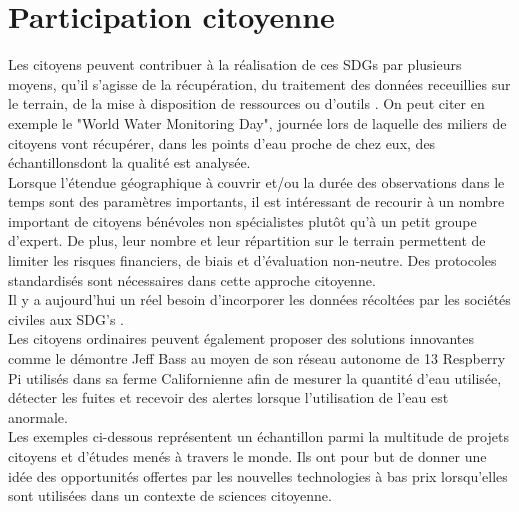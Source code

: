 \documentclass[10pt, article]{llncs}
\begin{document}
\section{Participation citoyenne}
	Les citoyens peuvent contribuer à la réalisation de ces SDGs par plusieurs moyens, qu'il s'agisse de la récupération, du traitement des données receuillies sur le terrain, de la mise à disposition de ressources ou d'outils \cite{lordkipanidze_che_nodate}. On peut citer en exemple le "World Water Monitoring Day", journée lors de laquelle des miliers de citoyens vont récupérer, dans les points d'eau proche de chez eux, des échantillonsdont la qualité est analysée. \\
	Lorsque l'étendue géographique à couvrir et/ou la durée des observations dans le temps sont des paramètres importants, il est intéressant de recourir à un nombre important de citoyens bénévoles non spécialistes plutôt qu'à un petit groupe d'expert. De plus, leur nombre et leur répartition sur le terrain permettent de limiter les risques financiers, de biais et d'évaluation non-neutre. Des protocoles standardisés sont nécessaires dans cette approche citoyenne.\\
	Il y a aujourd'hui un réel besoin d'incorporer les données récoltées par les sociétés civiles aux SDG's \cite{fluckiger_sustainable_2016}.\\
	Les citoyens ordinaires peuvent également proposer des solutions innovantes comme le démontre Jeff Bass au moyen de son réseau autonome de 13 Respberry Pi utilisés dans sa ferme Californienne afin de mesurer la quantité d'eau utilisée, détecter les fuites et recevoir des alertes lorsque l'utilisation de l'eau est anormale.\\
	Les exemples ci-dessous représentent un échantillon parmi la multitude de projets citoyens et d'études menés à travers le monde. Ils ont pour but de donner une idée des opportunités offertes par les nouvelles technologies à bas prix lorsqu'elles sont utilisées dans un contexte de sciences citoyenne.
	
\end{document}
